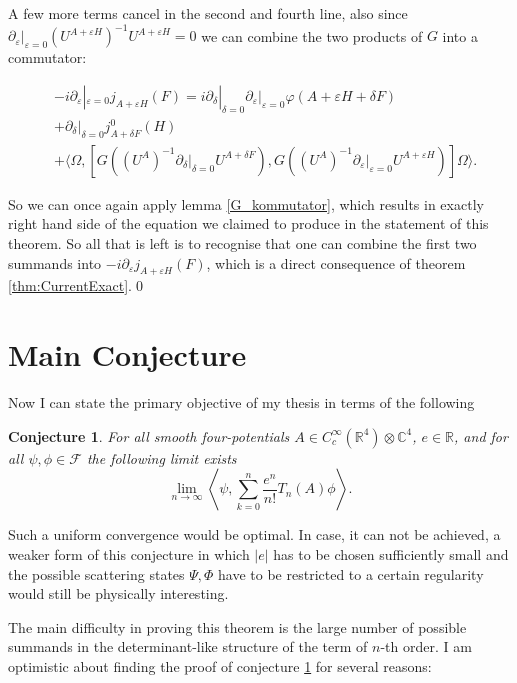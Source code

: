 \documentclass[b5paper,draft,openbib,12pt]{memoir}
\newtheorem{Conj}[Def]{Conjecture}
\begin{document}
A few more terms cancel in the second and fourth line, also since \(\partial_\varepsilon |_{\varepsilon=0} \left(U^{A+\varepsilon H}\right)^{-1} U^{A+\varepsilon H}=0\) we can combine the two products of \(G\) into a commutator:

\begin{align*}
&-i\partial_\varepsilon |_{\varepsilon=0} j_{A+\varepsilon H}(F)=
i\partial_\delta |_{\delta=0}   \partial_\varepsilon |_{\varepsilon=0}\varphi(A+\varepsilon H + \delta F)\\
&+\partial_\delta |_{\delta=0}  j^0_{A+\delta F}(H)\\
&+\langle \Omega, \left[G\left( \left(U^{A}\right)^{-1}\partial_\delta |_{\delta=0} U^{A + \delta F} \right), G\left( \left(U^{A}\right)^{-1}\partial_\varepsilon |_{\varepsilon=0} U^{A+\varepsilon H} \right)\right] \Omega \rangle.
\end{align*}

So we can once again apply lemma \ref{G_kommutator}, which results in exactly right hand side of the equation
we claimed to produce in the statement of this theorem. So all that is left is to recognise that one can combine
the first two summands into \(-i \partial_{\varepsilon} j_{A+\varepsilon H} (F)\), which is a direct consequence
of theorem \ref{thm:CurrentExact}.\qed


\section{Main Conjecture}\label{sec:main result}
Now I can state the primary objective of my thesis in terms of the following
\begin{Conj}\label{main_result}
For all smooth four-potentials \(A\in C_{c}^\infty(\mathbb{R}^4)\otimes
\mathbb{C}^4\),
\(e \in \mathbb{R}\), and for all \(\psi, \phi \in
\mathcal{F}\) the following limit exists
\begin{equation}
\lim_{n\rightarrow \infty} \left\langle \psi, \sum_{k=0}^n  \frac{e^n}{n!} T_n (A)\phi \right\rangle.
\end{equation}
\end{Conj}

Such a uniform convergence would be optimal. In case, it can not be achieved, a
weaker form of this conjecture in which $|e|$ has to be chosen sufficiently
small and the possible scattering states $\Psi,\Phi$ have to be restricted to a
certain regularity would still be physically interesting.

The main difficulty in proving this theorem is the large number of  possible
summands in the determinant-like structure of the term of \(n\)-th order.  I am
optimistic about finding the proof of conjecture \ref{main_result} for several
reasons:
\end{document}
